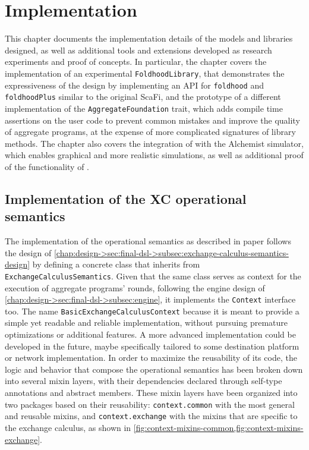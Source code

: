 \chapter{Implementation}
\label{chap:implementation}

This chapter documents the implementation details of the models and libraries designed, as well as additional tools and extensions developed as research experiments and proof of concepts.
%
In particular, the chapter covers the implementation of an experimental \texttt{FoldhoodLibrary}, that demonstrates the expressiveness of the \this design by implementing an \ac{API} for \texttt{foldhood} and \texttt{foldhoodPlus} similar to the original ScaFi, and the prototype of a different implementation of the \texttt{AggregateFoundation} trait, which adds compile time assertions on the user code to prevent common mistakes and improve the quality of aggregate programs, at the expense of more complicated signatures of library methods.
%
The chapter also covers the integration of \this with the Alchemist simulator, which enables graphical and more realistic simulations, as well as additional proof of the functionality of \this.

\section{Implementation of the XC operational semantics} \label{chap:implementation->sec:xc-ops}

The implementation of the operational semantics as described in paper\cite{xc} follows the design of \cref{chap:design->sec:final-dsl->subsec:exchange-calculus-semantics-design} by defining a concrete class that inherits from \texttt{ExchangeCalculusSemantics}.
%
Given that the same class serves as context for the execution of aggregate programs' rounds, following the engine design of \cref{chap:design->sec:final-dsl->subsec:engine}, it implements the \texttt{Context} interface too.
%
The name \texttt{BasicExchangeCalculusContext} because it is meant to provide a simple yet readable and reliable implementation, without pursuing premature optimizations or additional features.
%
A more advanced implementation could be developed in the future, maybe specifically tailored to some destination platform or network implementation.
%
In order to maximize the reusability of its code, the logic and behavior that compose the operational semantics has been broken down into several mixin layers, with their dependencies declared through self-type annotations and abstract members.
%
These mixin layers have been organized into two packages based on their reusability: \texttt{context.common} with the most general and reusable mixins, and \texttt{context.exchange} with the mixins that are specific to the exchange calculus, as shown in \cref{fig:context-mixins-common,fig:context-mixins-exchange}.

